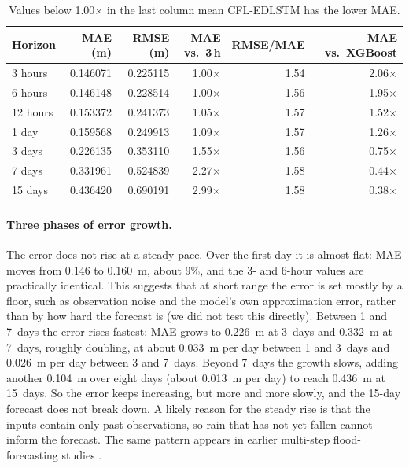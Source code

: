 \begin{table}[htbp]
  \centering
  \caption{CFL-EDLSTM Error Behavior Across Forecast Horizons}
  \label{tab:4.8}
  \small
  \renewcommand{\arraystretch}{1.15}
  \begin{tabular}{@{}l r r r r r@{}}
    \toprule
    \textbf{Horizon} & \textbf{MAE (m)} & \textbf{RMSE (m)} & \textbf{MAE vs.\ 3\,h} & \textbf{RMSE/MAE} & \textbf{MAE vs.\ XGBoost} \\
    \midrule
    3 hours  & 0.146071 & 0.225115 & 1.00$\times$ & 1.54 & 2.06$\times$ \\
    6 hours  & 0.146148 & 0.228514 & 1.00$\times$ & 1.56 & 1.95$\times$ \\
    12 hours & 0.153372 & 0.241373 & 1.05$\times$ & 1.57 & 1.52$\times$ \\
    1 day    & 0.159568 & 0.249913 & 1.09$\times$ & 1.57 & 1.26$\times$ \\
    3 days   & 0.226135 & 0.353110 & 1.55$\times$ & 1.56 & 0.75$\times$ \\
    7 days   & 0.331961 & 0.524839 & 2.27$\times$ & 1.58 & 0.44$\times$ \\
    15 days  & 0.436420 & 0.690191 & 2.99$\times$ & 1.58 & 0.38$\times$ \\
    \bottomrule
  \end{tabular}
  \caption*{\footnotesize Values below 1.00$\times$ in the last column mean CFL-EDLSTM has the lower MAE.}
\end{table}

\paragraph{Three phases of error growth.}
The error does not rise at a steady pace. Over the first day it is almost flat:
MAE moves from 0.146 to 0.160~m, about 9\%, and the 3- and 6-hour values are
practically identical. This suggests that at short range the error is set mostly
by a floor, such as observation noise and the model's own approximation error,
rather than by how hard the forecast is (we did not test this directly). Between
1 and 7~days the error rises fastest: MAE grows to 0.226~m at 3~days and 0.332~m
at 7~days, roughly doubling, at about 0.033~m per day between 1 and 3~days and
0.026~m per day between 3 and 7~days. Beyond 7~days the growth slows, adding
another 0.104~m over eight days (about 0.013~m per day) to reach 0.436~m at
15~days. So the error keeps increasing, but more and more slowly, and the 15-day
forecast does not break down. A likely reason for the steady rise is that the
inputs contain only past observations, so rain that has not yet fallen cannot
inform the forecast. The same pattern appears in earlier multi-step
flood-forecasting studies \cite{Kao2020,Cui2022,Yuan2023}.

